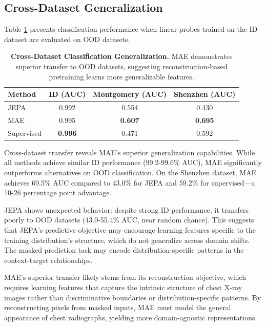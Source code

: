 \documentclass[11pt,a4paper]{article}
\begin{document}
\subsection{Cross-Dataset Generalization}

Table \ref{tab:cross_dataset} presents classification performance when linear probes trained on the ID dataset are evaluated on OOD datasets.

\begin{table}[h]
\centering
\caption{\textbf{Cross-Dataset Classification Generalization.} MAE demonstrates superior transfer to OOD datasets, suggesting reconstruction-based pretraining learns more generalizable features.}
\label{tab:cross_dataset}
\begin{tabular}{@{}lccc@{}}
\toprule
\textbf{Method} & \textbf{ID (AUC)} & \textbf{Montgomery (AUC)} & \textbf{Shenzhen (AUC)} \\
\midrule
JEPA & 0.992 & 0.554 & 0.430 \\
MAE & 0.995 & \textbf{0.607} & \textbf{0.695} \\
Supervised & \textbf{0.996} & 0.471 & 0.592 \\
\bottomrule
\end{tabular}
\end{table}

Cross-dataset transfer reveals MAE's superior generalization capabilities. While all methods achieve similar ID performance (99.2-99.6\% AUC), MAE significantly outperforms alternatives on OOD classification. On the Shenzhen dataset, MAE achieves 69.5\% AUC compared to 43.0\% for JEPA and 59.2\% for supervised—a 10-26 percentage point advantage.

JEPA shows unexpected behavior: despite strong ID performance, it transfers poorly to OOD datasets (43.0-55.4\% AUC, near random chance). This suggests that JEPA's predictive objective may encourage learning features specific to the training distribution's structure, which do not generalize across domain shifts. The masked prediction task may encode distribution-specific patterns in the context-target relationships.

MAE's superior transfer likely stems from its reconstruction objective, which requires learning features that capture the intrinsic structure of chest X-ray images rather than discriminative boundaries or distribution-specific patterns. By reconstructing pixels from masked inputs, MAE must model the general appearance of chest radiographs, yielding more domain-agnostic representations.
\end{document}
